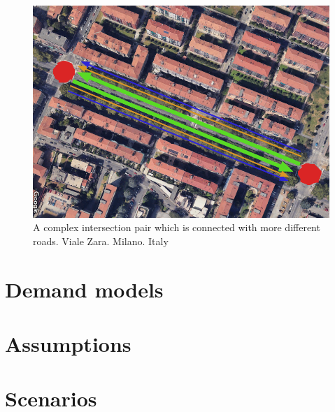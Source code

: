 \begin{figure}[t]
    \centering
    \includegraphics[width=0.75\linewidth]{figures/multigraph-is-better-than-nothing.png}
    \caption{A complex intersection pair which is connected with more different roads. Viale Zara. Milano. Italy}
    \label{fig:multigraph-is-better-than-nothing}
\end{figure}

\section{Demand models}

\section{Assumptions}

\section{Scenarios}
